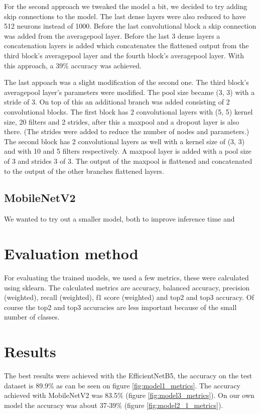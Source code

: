 \documentclass[twocolumn]{article}
\begin{document}
	For the second approach we tweaked the model a bit, we decided to try adding skip connections to the model. The last dense layers were also reduced to have 512 neurons instead of 1000.
	Before the last convolutional block a skip connection was added from the averagepool layer. Before the last 3 dense layers a concatenation layers is added which concatenates the flattened output from the third block's averagepool layer and the fourth block's averagepool layer.
	With this approach, a 39\% accuracy was achieved.
	
	The last appoach was a slight modification of the second one.
	The third block's averagepool layer's parameters were modified. The pool size became (3, 3) with a stride of 3. On top of this an additional branch was added consisting of 2 convolutional blocks. The first block has 2 convolutional layers with (5, 5) kernel size, 20 filters and 2 strides, after this a maxpool and a dropout layer is also there. (The strides were added to reduce the number of nodes and parameters.) 
	The second block has 2 convolutional layers as well with a kernel size of (3, 3) and with 10 and 5 filters respectively. A maxpool layer is added with a pool size of 3 and strides 3 of 3. The output of the maxpool is flattened and concatenated to the output of the other branches flattened layers.
	
	
	\subsection{MobileNetV2}
	
	We wanted to try out a smaller model, both to improve inference time and 
	
	\section{Evaluation method}
	For evaluating the trained models, we used a few metrics, these were calculated using sklearn. The calculated metrics are accuracy, balanced accuracy, precision (weighted), recall (weighted), f1 score (weighted) and top2 and top3 accuracy. Of course the top2 and top3 accuracies are less important because of the small number of classes.
	
	\section{Results}
	The best results were achieved with the EfficientNetB5, the accuracy on the test dataset is 89.9\% as can be seen on figure \ref{fig:model1_metrics}. The accuracy achieved with MobileNetV2 was 83.5\% (figure \ref{fig:model3_metrics}). On our own model the accuracy was about 37-39\% (figure \ref{fig:model2_1_metrics}).
	
\end{document}
